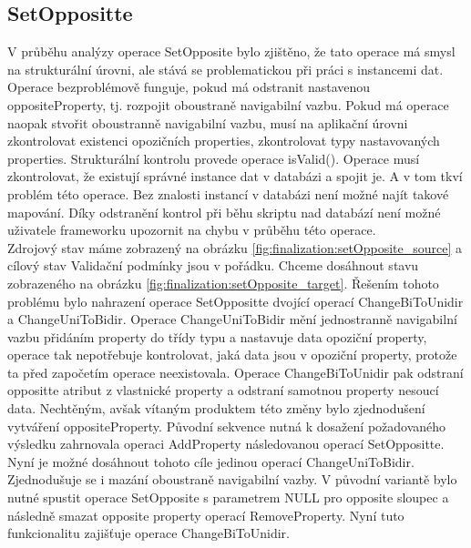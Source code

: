 \documentclass[11pt,twoside,a4paper]{book}
\begin{document}
\subsection{SetOppositte}
V průběhu analýzy operace SetOpposite bylo zjištěno, že tato operace má smysl na
strukturální úrovni, ale stává se problematickou při práci s instancemi dat.
Operace bezproblémově funguje, pokud má odstranit nastavenou oppositeProperty,
tj. rozpojit oboustraně navigabilní vazbu. Pokud má operace naopak stvořit
oboustranně navigabilní vazbu, musí na aplikační úrovni zkontrolovat
existenci opozičních properties, zkontrolovat typy nastavovaných properties.
Strukturální kontrolu provede operace isValid(). Operace musí zkontrolovat, že
existují správné instance dat v databázi a spojit je. A v tom tkví problém této
operace. Bez znalosti instancí v databázi není možné najít takové mapování. Díky
odstranění kontrol při běhu skriptu nad databází není možné uživatele frameworku
upozornit na chybu v průběhu této operace.\\

Zdrojový stav máme zobrazený na obrázku
\ref{fig:finalization:setOpposite_source} a cílový stav Validační podmínky jsou
v pořádku.
Chceme dosáhnout stavu zobrazeného na obrázku
\ref{fig:finalization:setOpposite_target}. Řešením tohoto problému bylo
nahrazení operace SetOppositte dvojící operací ChangeBiToUnidir a
ChangeUniToBidir. Operace ChangeUniToBidir mění jednostranně navigabilní vazbu
přidáním property do třídy typu a nastavuje data opoziční property, operace tak
nepotřebuje kontrolovat, jaká data jsou v opoziční property, protože ta před započetím
operace neexistovala. Operace ChangeBiToUnidir pak odstraní oppositte atribut z
vlastnické property a odstraní samotnou property nesoucí data. Nechtěným, avšak
vítaným produktem této změny bylo zjednodušení vytváření oppositeProperty.
Původní sekvence nutná k dosažení požadovaného výsledku zahrnovala operaci
AddProperty následovanou operací SetOppositte.
Nyní je možné dosáhnout tohoto cíle jedinou operací ChangeUniToBidir.
Zjednodušuje se i mazání oboustraně navigabilní vazby. V původní variantě bylo
nutné spustit operace SetOpposite s parametrem NULL pro opposite sloupec a
následně smazat opposite property operací RemoveProperty. Nyní tuto
funkcionalitu zajišťuje operace ChangeBiToUnidir.
\end{document}
